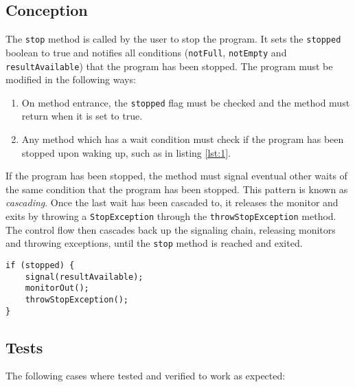 \documentclass{article}
\begin{document}
    \subsection*{Conception}

    The \texttt{stop} method is called by the user to stop the program.
    It sets the \texttt{stopped} boolean to true and notifies all conditions (\texttt{notFull}, \texttt{notEmpty} and \texttt{resultAvailable}) that the program has been stopped.
    The program must be modified in the following ways:
    \begin{enumerate}
        \item On method entrance, the \texttt{stopped} flag must be checked and the method must return when it is set to true.
        \item Any method which has a wait condition must check if the program has been stopped upon waking up, such as in listing \ref{lst:1}.
    \end{enumerate}

    If the program has been stopped, the method must signal eventual other waits of the same condition that the program has been stopped.
    This pattern is known as \textit{cascading}.
    Once the last wait has been cascaded to, it releases the monitor and exits by throwing a \texttt{StopException} through the \texttt{throwStopException} method.
    The control flow then cascades back up the signaling chain, releasing monitors and throwing exceptions, until the \texttt{stop} method is reached and exited.

    \begin{lstlisting}[caption={Excrept of the stop condition checking in the \texttt{ComputationManager::getNextResult()} method.}, captionpos=b, label=lst:1]
if (stopped) {
    signal(resultAvailable);
    monitorOut();
    throwStopException();
}
    \end{lstlisting}

    \subsection*{Tests}

    The following cases where tested and verified to work as expected:
\end{document}
